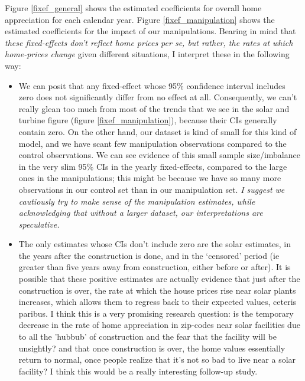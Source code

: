 \documentclass{article}
\begin{document}
Figure \ref{fixef_general} shows the estimated coefficients for overall home appreciation for each calendar year.
Figure \ref{fixef_manipulation} shows the estimated coefficients for the impact of our manipulations.
Bearing in mind that \emph{these fixed-effects don't reflect home prices per se, but rather, the rates at which home-prices change} given different situations, I interpret these in the following way:
\begin{itemize}
\item We can posit that any fixed-effect whose 95\% confidence interval includes zero does not significantly differ from no effect at all. 
Consequently, we can't really glean too much from  most of the trends that we see in the solar and turbine figure (figure \ref{fixef_manipulation}), because their CIs generally contain zero. 
On the other hand, our dataset is kind of small for this kind of model, and we have scant few manipulation observations compared to the control observations.
We can see evidence of this small sample size/imbalance in the very slim 95\% CIs in the yearly fixed-effects, compared to the large ones in the manipulations; this might be because we have so many more observations in our control set than in our manipulation set. 
\emph{I suggest we cautiously try to make sense of the manipulation estimates, while acknowledging that without a larger dataset, our interpretations are speculative.}
\item The only estimates whose CIs don't include zero are the solar estimates, in the years after the construction is done, and in the `censored' period (ie greater than five years away from construction, either before or after). 
It is possible that these positive estimates are actually evidence that just after the construction is over, the rate at which the house prices rise near solar plants increases, which allows them to regress back to their expected values, ceteris paribus.
I think this is a very promising research question: is the temporary decrease in the rate of home appreciation in zip-codes near solar facilities due to all the 'hubbub' of construction and the fear that the facility will be unsightly? and that once construction is over, the home values essentially return to normal, once people realize that it's not so bad to live near a solar facility?
I think this would be a really interesting follow-up study.


\end{itemize}
\end{document}
